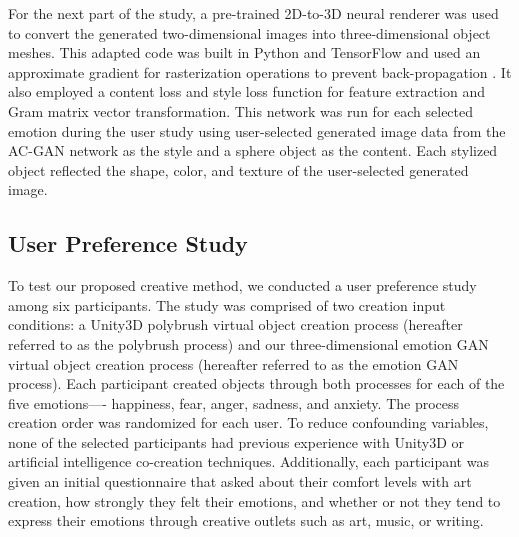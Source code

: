 \documentclass{sigchi}
\begin{document}
For the next part of the study, a pre-trained 2D-to-3D neural renderer \cite{DBLP:journals/corr/abs-1711-07566} was used to convert the generated two-dimensional images into three-dimensional object meshes. This adapted code was built in Python and TensorFlow and used an approximate gradient for rasterization operations to prevent back-propagation \cite{DBLP:journals/corr/abs-1711-07566}. It also employed a content loss and style loss function for feature extraction and Gram matrix vector transformation. This network was run for each selected emotion during the user study using user-selected generated image data from the AC-GAN network as the style and a sphere object as the content. Each stylized object reflected the shape, color, and texture of the user-selected generated image. 

\subsection{User Preference Study}
To test our proposed creative method, we conducted a user preference study among six participants. The study was comprised of two creation input conditions: a Unity3D polybrush virtual object creation process (hereafter referred to as the polybrush process) and our three-dimensional emotion GAN virtual object creation process (hereafter referred to as the emotion GAN process). Each participant created objects through both processes for each of the five emotions---- happiness, fear, anger, sadness, and anxiety. The process creation order was randomized for each user. To reduce confounding variables, none of the selected participants had previous experience with Unity3D or artificial intelligence co-creation techniques. Additionally, each participant was given an initial questionnaire that asked about their comfort levels with art creation, how strongly they felt their emotions, and whether or not they tend to express their emotions through creative outlets such as art, music, or writing.
\end{document}
